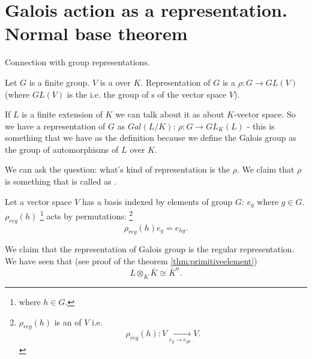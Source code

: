 \section{Galois action as a representation. Normal base theorem}

Connection with group representations.
\begin{definition}
  Let $G$ is a finite group. $V$ is a  over
  $K$. Representation of $G$ is a 
  $\rho: G \to GL\left(V\right)$
  (where $GL\left(V\right)$ is the  i.e. the group of
  s of the vector space $V$).
  \label{def:grouprepresentation}
\end{definition}

If $L$ is a finite extension of $K$ we can talk about it as about
$K$-vector space. So we have a representation of $G$ as
 $Gal\left(L/K\right)$:
$\rho: G \to GL_K\left(L\right)$ - this is something that we have as
the definition because we define the Galois group as the group of
automorphisms of $L$ over $K$.

We can ask the question: what's kind of representation is the
$\rho$. We claim that $\rho$ is something that is called as
.
\begin{definition}
  Let a vector space $V$ has a basis indexed by elements of group $G$:
  $e_g$ where $g \in G$. $\rho_{reg}\left(h\right)$
  \footnote{
    where $h \in G$.
  }
  acts by
  permutations:
  \footnote{
    $\rho_{reg}\left(h\right)$ is an  of $V$
    i.e.
    \[
    \rho_{reg}\left(h\right): V \xrightarrow[e_g \to e_{gh}]{} V.
    \]
  }
  \[
  \rho_{reg}\left(h\right) e_g = e_{hg}.
  \]
  \label{def:regularrepresentation}
\end{definition}

We claim that the representation of Galois group is the regular
representation. We have seen that (see proof of the theorem
\ref{thm:primitiveelement}) 
\[
L \otimes_K \bar{K} \cong \bar{K}^n.
\]


